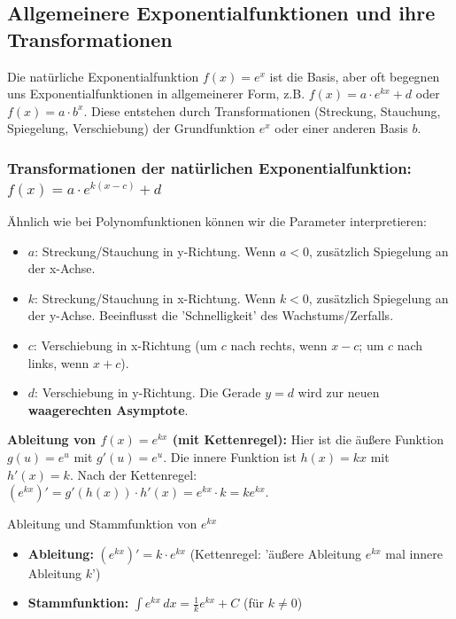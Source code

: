 \subsection{Allgemeinere Exponentialfunktionen und ihre Transformationen}
\label{subsec:allgemeine_exp_funktionen}

Die natürliche Exponentialfunktion $f(x)=e^x$ ist die Basis, aber oft begegnen uns Exponentialfunktionen in allgemeinerer Form, z.B. $f(x) = a \cdot e^{kx} + d$ oder $f(x) = a \cdot b^x$. Diese entstehen durch Transformationen (Streckung, Stauchung, Spiegelung, Verschiebung) der Grundfunktion $e^x$ oder einer anderen Basis $b$.

\subsubsection{Transformationen der natürlichen Exponentialfunktion: $f(x) = a \cdot e^{k(x-c)} + d$}

Ähnlich wie bei Polynomfunktionen können wir die Parameter interpretieren:
\begin{itemize}
    \item $a$: Streckung/Stauchung in y-Richtung. Wenn $a<0$, zusätzlich Spiegelung an der x-Achse.
    \item $k$: Streckung/Stauchung in x-Richtung. Wenn $k<0$, zusätzlich Spiegelung an der y-Achse. Beeinflusst die 'Schnelligkeit' des Wachstums/Zerfalls.
    \item $c$: Verschiebung in x-Richtung (um $c$ nach rechts, wenn $x-c$; um $c$ nach links, wenn $x+c$).
    \item $d$: Verschiebung in y-Richtung. Die Gerade $y=d$ wird zur neuen \textbf{waagerechten Asymptote}.
\end{itemize}

\textbf{Ableitung von $f(x) = e^{kx}$ (mit Kettenregel):}
Hier ist die äußere Funktion $g(u)=e^u$ mit $g'(u)=e^u$.
Die innere Funktion ist $h(x)=kx$ mit $h'(x)=k$.
Nach der Kettenregel: $(e^{kx})' = g'(h(x)) \cdot h'(x) = e^{kx} \cdot k = k e^{kx}$.

\begin{merksatzumgebung}{Ableitung und Stammfunktion von $e^{kx}$}
\begin{itemize}
    \item \textbf{Ableitung:} $(e^{kx})' = k \cdot e^{kx}$ (Kettenregel: 'äußere Ableitung $e^{kx}$ mal innere Ableitung $k$')
    \item \textbf{Stammfunktion:} $\int e^{kx} \,dx = \frac{1}{k} e^{kx} + C$ (für $k \neq 0$)
\end{itemize}
\end{merksatzumgebung}

